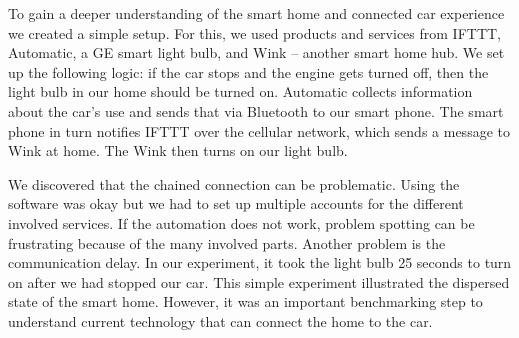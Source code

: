 To gain a deeper understanding of the smart home and connected car experience we created a simple setup. For this, we used products and services from IFTTT, Automatic, a GE smart light bulb, and Wink -- another smart home hub. We set up the following logic: if the car stops and the engine gets turned off, then the light bulb in our home should be turned on. Automatic collects information about the car's use and sends that via Bluetooth to our smart phone. The smart phone in turn notifies IFTTT over the cellular network, which sends a message to Wink at home. The Wink then  turns on our light bulb.

We discovered that the chained connection can be problematic. Using the software was okay but we had to set up multiple accounts for the different involved services. If the automation does not work, problem spotting can be frustrating because of the many involved parts. Another problem is the communication delay. In our experiment, it took the light bulb 25 seconds to turn on after we had stopped our car.
This simple experiment illustrated the dispersed state of the smart home. However, it was an important benchmarking step to understand current technology that can connect the home to the car.


